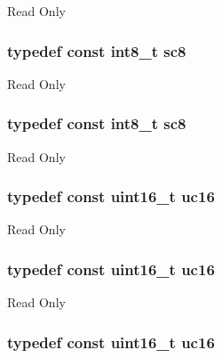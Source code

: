 Read Only \hypertarget{group___exported__types_ga30e6c0f6718e1b6d26dc9d94ddcf9d11}{
\subsubsection[{sc8}]{\setlength{\rightskip}{0pt plus 5cm}typedef const int8\-\_\-t {\bf sc8}}}\label{group___exported__types_ga30e6c0f6718e1b6d26dc9d94ddcf9d11}
Read Only \hypertarget{group___exported__types_ga30e6c0f6718e1b6d26dc9d94ddcf9d11}{
\subsubsection[{sc8}]{\setlength{\rightskip}{0pt plus 5cm}typedef const int8\-\_\-t {\bf sc8}}}\label{group___exported__types_ga30e6c0f6718e1b6d26dc9d94ddcf9d11}
Read Only \hypertarget{group___exported__types_gabc715ea3779494b5a4f53173a397f7cb}{
\subsubsection[{uc16}]{\setlength{\rightskip}{0pt plus 5cm}typedef const uint16\-\_\-t {\bf uc16}}}\label{group___exported__types_gabc715ea3779494b5a4f53173a397f7cb}
Read Only \hypertarget{group___exported__types_gabc715ea3779494b5a4f53173a397f7cb}{
\subsubsection[{uc16}]{\setlength{\rightskip}{0pt plus 5cm}typedef const uint16\-\_\-t {\bf uc16}}}\label{group___exported__types_gabc715ea3779494b5a4f53173a397f7cb}
Read Only \hypertarget{group___exported__types_gabc715ea3779494b5a4f53173a397f7cb}{
\subsubsection[{uc16}]{\setlength{\rightskip}{0pt plus 5cm}typedef const uint16\-\_\-t {\bf uc16}}}\label{group___exported__types_gabc715ea3779494b5a4f53173a397f7cb}
